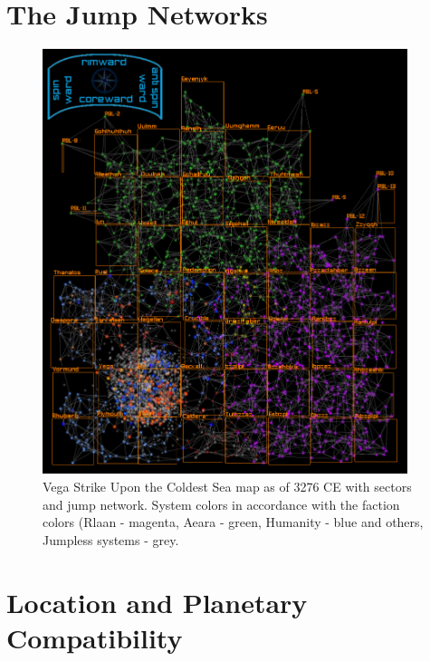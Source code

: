 \section{The Jump Networks}

\begin{figure} \begin{center}
	\includegraphics[width=0.95\textwidth]{../images/vega-strike-utcs-map-3276.png}
    \caption{Vega Strike Upon the Coldest Sea map as of 3276 CE with sectors and jump network. System colors in accordance with the faction colors (Rlaan - magenta, Aeara - green, Humanity - blue and others, Jumpless systems - grey. }
    \label{fig:rlaan-fins2}
\end{center} \end{figure}


\section{Location and Planetary Compatibility}
